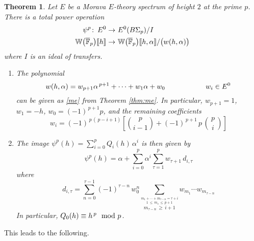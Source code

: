 \documentclass{gtpart}
\newtheorem{thm}[equation]{Theorem}
\theoremstyle{definition}
\theoremstyle{remark}
\def\co{\colon\thinspace}
\newcommand{\mb}[1]{\mathbb{#1}}
\newcommand{\cF}{\overline {\mb F}}
\newcommand{\BW}{{\mb W}}
\newcommand{\md}{~~{\rm mod}~}
\newcommand{\A}{\alpha}
\newcommand{\T}{\tau}
\newcommand{\lb}{\llbracket}
\newcommand{\rb}{\rrbracket}
\renewcommand{\=}{\approx}
\renewcommand{\-}{\sim}
\newcommand{\ch}[2]{{#1 \choose #2}}
\numberwithin{equation}{section}
\begin{document}
\begin{thm}
 \label{thm:po}
 Let $E$ be a Morava $E$-theory spectrum of height $2$ at the prime $p$.  There 
 is a total power operation 
 \[
  \begin{split}
                \psi^p \co E^0 \to & ~ E^0(B\Sigma_p) / I \\
   \BW\big(\cF_p\big)\lb h \rb \to & ~ \BW\big(\cF_p\big)\lb h,\A \rb 
                                       / \big( w(h,\A) \big) 
  \end{split}
 \]
 where $I$ is an ideal of transfers.  

 \begin{enumerate}[{\em (i)}]
  \item The polynomial 
  \[
   w(h,\A) = w_{p + 1} \A^{\,p + 1} + \cdots + w_1 \A + w_0 
   \hskip 2cm w_i \in E^0 
  \]
  can be given as \eqref{me} from Theorem \ref{thm:me}.  In particular, 
  $w_{p + 1} = 1$, $w_1 = -h$, $w_0 = (-1)^{\,p + 1} p$, and the remaining 
  coefficients 
  \[
   w_i = (-1)^{\,p\,(\,p - i + 1)} \left[ \ch{p}{i - 1} 
         + (-1)^{\,p + 1} \, p \, \ch{\,p\,}{i} \right] 
  \]

  \item The image $\psi^p(h) = \sum_{i = 0}^p Q_i(h) \, \A^i$ is then given by 
  \[
   \psi^p(h) = \A + \sum_{i = 0}^p \A^i \sum_{\T = 1}^p w_{\T + 1} \, d_{i,\T} 
  \]
  where 
  \[
   d_{i,\T} = \sum_{n = 0}^{\T - 1} (-1)^{\T - n} \, w_0^n 
              \sum_{\stackrel{\scriptstyle m_1 + \cdots + m_{\T - n} = \T + i} 
              {\stackrel{\scriptstyle 1 \,\leq\, m_s \,\leq\, p + 1}{m_{\T - n} 
              \,\geq\, i + 1}}} w_{m_1} \cdots w_{m_{\T - n}} 
  \]
  In particular, $Q_0(h) \equiv h^{\,p} \md p$.  
 \end{enumerate}
\end{thm}

This leads to the following.  
\end{document}
